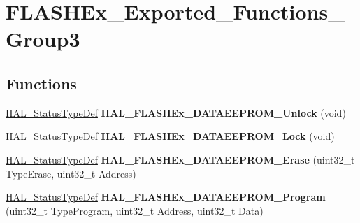 \hypertarget{group___f_l_a_s_h_ex___exported___functions___group3}{\section{F\-L\-A\-S\-H\-Ex\-\_\-\-Exported\-\_\-\-Functions\-\_\-\-Group3}
\label{group___f_l_a_s_h_ex___exported___functions___group3}
}
\subsection*{Functions}
\begin{DoxyCompactItemize}
\item 
\hypertarget{group___f_l_a_s_h_ex___exported___functions___group3_ga082faf633bcd8b7b4c1283fec5bd08ee}{\hyperlink{stm32l1xx__hal__def_8h_a63c0679d1cb8b8c684fbb0632743478f}{H\-A\-L\-\_\-\-Status\-Type\-Def} {\bfseries H\-A\-L\-\_\-\-F\-L\-A\-S\-H\-Ex\-\_\-\-D\-A\-T\-A\-E\-E\-P\-R\-O\-M\-\_\-\-Unlock} (void)}\label{group___f_l_a_s_h_ex___exported___functions___group3_ga082faf633bcd8b7b4c1283fec5bd08ee}

\item 
\hypertarget{group___f_l_a_s_h_ex___exported___functions___group3_gac96f288a5ca4d57e336c909903961e22}{\hyperlink{stm32l1xx__hal__def_8h_a63c0679d1cb8b8c684fbb0632743478f}{H\-A\-L\-\_\-\-Status\-Type\-Def} {\bfseries H\-A\-L\-\_\-\-F\-L\-A\-S\-H\-Ex\-\_\-\-D\-A\-T\-A\-E\-E\-P\-R\-O\-M\-\_\-\-Lock} (void)}\label{group___f_l_a_s_h_ex___exported___functions___group3_gac96f288a5ca4d57e336c909903961e22}

\item 
\hypertarget{group___f_l_a_s_h_ex___exported___functions___group3_ga3dd6b773ce927a0a2fe5708c742db642}{\hyperlink{stm32l1xx__hal__def_8h_a63c0679d1cb8b8c684fbb0632743478f}{H\-A\-L\-\_\-\-Status\-Type\-Def} {\bfseries H\-A\-L\-\_\-\-F\-L\-A\-S\-H\-Ex\-\_\-\-D\-A\-T\-A\-E\-E\-P\-R\-O\-M\-\_\-\-Erase} (uint32\-\_\-t Type\-Erase, uint32\-\_\-t Address)}\label{group___f_l_a_s_h_ex___exported___functions___group3_ga3dd6b773ce927a0a2fe5708c742db642}

\item 
\hypertarget{group___f_l_a_s_h_ex___exported___functions___group3_ga8c76627b8f1073dfe90ac55d9a5bdd6f}{\hyperlink{stm32l1xx__hal__def_8h_a63c0679d1cb8b8c684fbb0632743478f}{H\-A\-L\-\_\-\-Status\-Type\-Def} {\bfseries H\-A\-L\-\_\-\-F\-L\-A\-S\-H\-Ex\-\_\-\-D\-A\-T\-A\-E\-E\-P\-R\-O\-M\-\_\-\-Program} (uint32\-\_\-t Type\-Program, uint32\-\_\-t Address, uint32\-\_\-t Data)}\label{group___f_l_a_s_h_ex___exported___functions___group3_ga8c76627b8f1073dfe90ac55d9a5bdd6f}


\end{DoxyCompactItemize}
